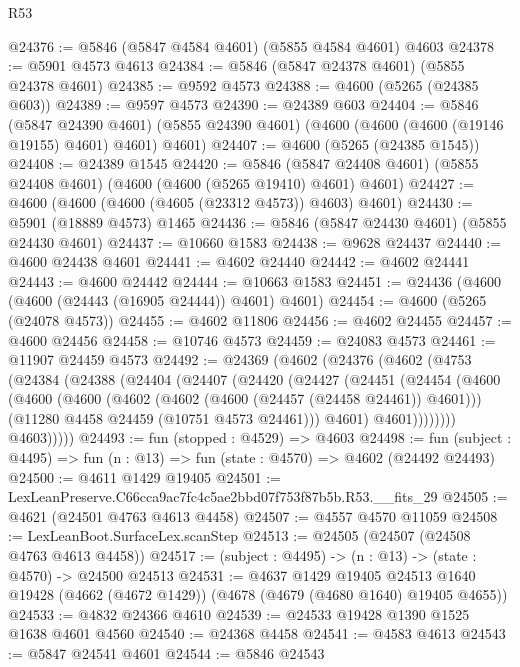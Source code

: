 \begin{lexlean}{R53}
\begin{coremodule}
@24376 := @5846 (@5847 @4584 @4601) (@5855 @4584 @4601) @4603
@24378 := @5901 @4573 @4613
@24384 := @5846 (@5847 @24378 @4601) (@5855 @24378 @4601)
@24385 := @9592 @4573
@24388 := @4600 (@5265 (@24385 @603))
@24389 := @9597 @4573
@24390 := @24389 @603
@24404 := @5846
    (@5847 @24390 @4601)
    (@5855 @24390 @4601)
    (@4600 (@4600 (@4600 (@19146 @19155) @4601) @4601) @4601)
@24407 := @4600 (@5265 (@24385 @1545))
@24408 := @24389 @1545
@24420 := @5846 (@5847 @24408 @4601) (@5855 @24408 @4601) (@4600 (@4600 (@5265 @19410) @4601) @4601)
@24427 := @4600 (@4600 (@4600 (@4605 (@23312 @4573)) @4603) @4601)
@24430 := @5901 (@18889 @4573) @1465
@24436 := @5846 (@5847 @24430 @4601) (@5855 @24430 @4601)
@24437 := @10660 @1583
@24438 := @9628 @24437
@24440 := @4600 @24438 @4601
@24441 := @4602 @24440
@24442 := @4602 @24441
@24443 := @4600 @24442
@24444 := @10663 @1583
@24451 := @24436 (@4600 (@4600 (@24443 (@16905 @24444)) @4601) @4601)
@24454 := @4600 (@5265 (@24078 @4573))
@24455 := @4602 @11806
@24456 := @4602 @24455
@24457 := @4600 @24456
@24458 := @10746 @4573
@24459 := @24083 @4573
@24461 := @11907 @24459 @4573
@24492 := @24369
    (@4602
      (@24376
        (@4602
          (@4753
            (@24384
              (@24388
                (@24404
                  (@24407
                    (@24420
                      (@24427
                        (@24451
                          (@24454
                            (@4600
                              (@4600
                                (@4600
                                  (@4602 (@4602 (@4600 (@24457 (@24458 @24461)) @4601)))
                                  (@11280 @4458 @24459 (@10751 @4573 @24461)))
                                @4601)
                              @4601))))))))
              @4603)))))
@24493 := fun (stopped : @4529) => @4603
@24498 := fun (subject : @4495) => fun (n : @13) => fun (state : @4570) => @4602 (@24492 @24493)
@24500 := @4611 @1429 @19405
@24501 := LexLeanPreserve.C66cca9ac7fc4c5ae2bbd07f753f87b5b.R53.__fits_29
@24505 := @4621 (@24501 @4763 @4613 @4458)
@24507 := @4557 @4570 @11059
@24508 := LexLeanBoot.SurfaceLex.scanStep
@24513 := @24505 (@24507 (@24508 @4763 @4613 @4458))
@24517 := (subject : @4495) -> (n : @13) -> (state : @4570) -> @24500 @24513
@24531 := @4637
    @1429
    @19405
    @24513
    @1640
    @19428
    (@4662 (@4672 @1429))
    (@4678 (@4679 (@4680 @1640) @19405 @4655))
@24533 := @4832 @24366 @4610
@24539 := @24533 @19428 @1390 @1525 @1638 @4601 @4560
@24540 := @24368 @4458
@24541 := @4583 @4613
@24543 := @5847 @24541 @4601
@24544 := @5846 @24543

\end{coremodule}
\end{lexlean}
